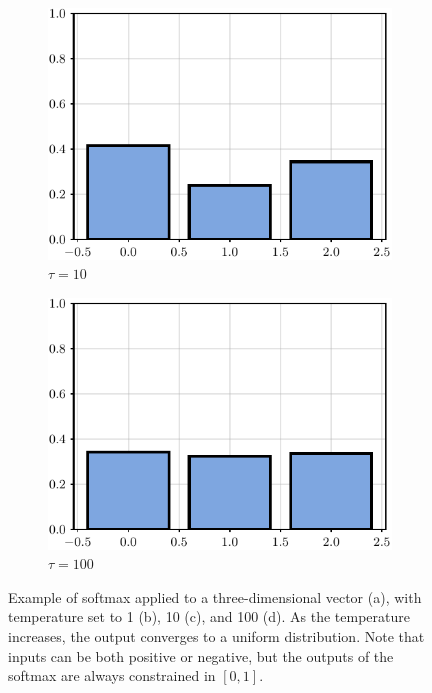 \begin{figure}[t]
\begin{subfigure}[b]{0.24\textwidth}
    \includegraphics[width=1.0\textwidth]{images/softmax_3.pdf}
    \caption{$\tau=10$}
    \end{subfigure}
    \hfill
    \begin{subfigure}[b]{0.24\textwidth}
    \includegraphics[width=1.0\textwidth]{images/softmax_4.pdf}
    \caption{$\tau=100$}
    \end{subfigure}
    \hfill
    \caption{Example of softmax applied to a three-dimensional vector (a), with temperature set to 1 (b), 10 (c), and 100 (d). As the temperature increases, the output converges to a uniform distribution. Note that inputs can be both positive or negative, but the outputs of the softmax are always constrained in $[0,1]$.}
    \label{fig:softmax}
\end{figure}


